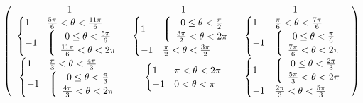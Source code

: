 \begin{equation}
\left(
\begin{array}{ccc}
1 & 1  & 1 \\
\begin{cases}
   1 & \frac{5 \pi }{6}<\theta <\frac{11 \pi }{6} \\
 -1 & \left\lgroup \begin{array}{c} 0\leq \theta <\frac{5 \pi }{6} \\ \frac{11 \pi }{6}<\theta <2 \pi  \end{array} \right.\\
\end{cases}
 &
\begin{cases}
 1   & \left\lgroup \begin{array}{c} 0\leq \theta <\frac{\pi }{2} \\ \frac{3 \pi }{2}<\theta <2 \pi  \end{array} \right.\\
 -1 & \frac{\pi }{2}<\theta <\frac{3 \pi }{2} \\
\end{cases}
 &
\begin{cases}
 1 & \frac{\pi}{6}<\theta <\frac{7 \pi }{6} \\
 -1 & \left\lgroup \begin{array}{c}  0\leq \theta <\frac{\pi}{6} \\ \frac{7 \pi }{6}<\theta <2 \pi  \end{array} \right.\\
\end{cases}
 \\

\begin{cases}
 1 & \frac{\pi }{3}<\theta <\frac{4 \pi }{3} \\
 -1 & \left\lgroup \begin{array}{c} 0 \leq \theta <\frac{\pi }{3} \\ \frac{4 \pi }{3}<\theta <2 \pi \end{array} \right. \\
\end{cases}
 &
\begin{cases}
 1 & \pi <\theta <2 \pi  \\
 -1 & 0<\theta <\pi  \\
\end{cases}
 &
\begin{cases}
   1 & \left\lgroup \begin{array}{c} 0\leq \theta <\frac{2 \pi }{3} \\ \frac{5 \pi }{3}<\theta <2 \pi  \end{array} \right.\\
 -1 & \frac{2 \pi }{3}<\theta <\frac{5 \pi }{3} \\
\end{cases}
 \\
\end{array}
\right)
\end{equation}

